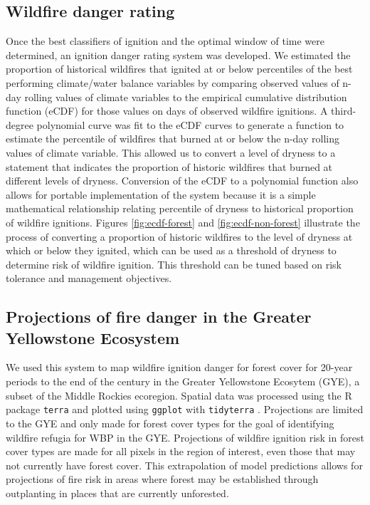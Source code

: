 \documentclass[11p]{article}
\begin{document}
\subsection{Wildfire danger rating}

Once the best classifiers of ignition and the optimal window of time were determined, an ignition danger rating system was developed. We estimated the proportion of historical wildfires that ignited at or below percentiles of the best performing climate/water balance variables by comparing observed values of n-day rolling values of climate variables to the empirical cumulative distribution function (eCDF) for those values on days of observed wildfire ignitions. A third-degree polynomial curve was fit to the eCDF curves to generate a function to estimate the percentile of wildfires that burned at or below the n-day rolling values of climate variable. This allowed us to convert a level of dryness to a statement that indicates the proportion of historic wildfires that burned at different levels of dryness. Conversion of the eCDF to a polynomial function also allows for portable implementation of the system because it is a simple mathematical relationship relating percentile of dryness to historical proportion of wildfire ignitions. Figures \ref{fig:ecdf-forest} and \ref{fig:ecdf-non-forest} illustrate the process of converting a proportion of historic wildfires to the level of dryness at which or below they ignited, which can be used as a threshold of dryness to determine risk of wildfire ignition. This threshold can be tuned based on risk tolerance and management objectives.

\subsection{Projections of fire danger in the Greater Yellowstone Ecosystem}

We used this system to map wildfire ignition danger for forest cover for 20-year periods to the end of the century in the Greater Yellowstone Ecosytem (GYE), a subset of the Middle Rockies ecoregion. Spatial data was processed using the R package \texttt{terra} \citep{hijmansTerraSpatialData2024} and plotted using \texttt{ggplot} \citep{wickhamGgplot2ElegantGraphics2016} with \texttt{tidyterra} \citep{hernangomezUsingTidyverseTerra2023}. Projections are limited to the GYE and only made for forest cover types for the goal of identifying wildfire refugia for WBP in the GYE. Projections of wildfire ignition risk in forest cover types are made for all pixels in the region of interest, even those that may not currently have forest cover. This extrapolation of model predictions allows for projections of fire risk in areas where forest may be established through outplanting in places that are currently unforested.
\end{document}
